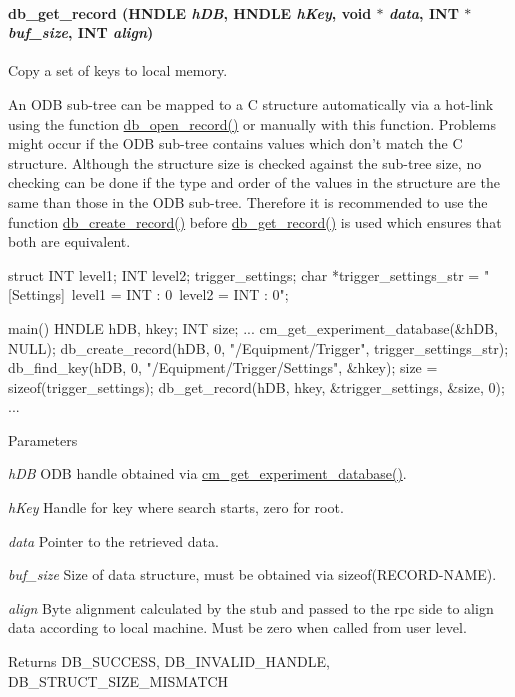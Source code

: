 \paragraph[{db\_\-get\_\-record}]{ db\_\-get\_\-record (HNDLE {\em hDB}, \/  HNDLE {\em hKey}, \/  void $\ast$ {\em data}, \/  {\bf INT} $\ast$ {\em buf\_\-size}, \/  {\bf INT} {\em align})}\hfill\label{group__odbfunctionc_ga7a9c0dd3e4bec48a07be99d2fc0e08cf}
Copy a set of keys to local memory.

An ODB sub-\/tree can be mapped to a C structure automatically via a hot-\/link using the function \hyperlink{group__odbfunctionc_ga852bc9fa8ee4d0884b328aeb0b0cfd63}{db\_\-open\_\-record()} or manually with this function. Problems might occur if the ODB sub-\/tree contains values which don't match the C structure. Although the structure size is checked against the sub-\/tree size, no checking can be done if the type and order of the values in the structure are the same than those in the ODB sub-\/tree. Therefore it is recommended to use the function \hyperlink{group__odbfunctionc_ga59b971e77416b2b463e2e63f1b05342b}{db\_\-create\_\-record()} before \hyperlink{group__odbfunctionc_ga7a9c0dd3e4bec48a07be99d2fc0e08cf}{db\_\-get\_\-record()} is used which ensures that both are equivalent. 
\begin{DoxyCode}
struct {
  INT level1;
  INT level2;
} trigger_settings;
char *trigger_settings_str =
"[Settings]\n\
level1 = INT : 0\n\
level2 = INT : 0";

main()
{
  HNDLE hDB, hkey;
  INT   size;
  ...
  cm_get_experiment_database(&hDB, NULL);
  db_create_record(hDB, 0, "/Equipment/Trigger", trigger_settings_str);
  db_find_key(hDB, 0, "/Equipment/Trigger/Settings", &hkey);
  size = sizeof(trigger_settings);
  db_get_record(hDB, hkey, &trigger_settings, &size, 0);
  ...
}
\end{DoxyCode}
 
\begin{DoxyParams}{Parameters}
\item[{\em hDB}]ODB handle obtained via \hyperlink{group__cmfunctionc_ga16b33b70783a3f5ba98b4094149d12b7}{cm\_\-get\_\-experiment\_\-database()}. \item[{\em hKey}]Handle for key where search starts, zero for root. \item[{\em data}]Pointer to the retrieved data. \item[{\em buf\_\-size}]Size of data structure, must be obtained via sizeof(RECORD-\/NAME). \item[{\em align}]Byte alignment calculated by the stub and passed to the rpc side to align data according to local machine. Must be zero when called from user level. \end{DoxyParams}
\begin{DoxyReturn}{Returns}
DB\_\-SUCCESS, DB\_\-INVALID\_\-HANDLE, DB\_\-STRUCT\_\-SIZE\_\-MISMATCH 
\end{DoxyReturn}


